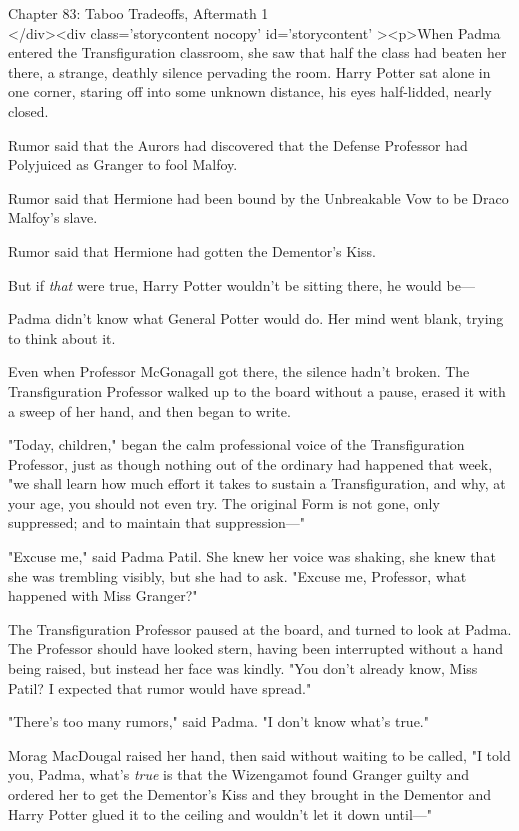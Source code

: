
Chapter 83: Taboo Tradeoffs, Aftermath 1\\
</div><div  class='storycontent nocopy' id='storycontent' ><p>When Padma 
entered the Transfiguration classroom, she saw that half the class had beaten 
her there, a strange, deathly silence pervading the room. Harry Potter sat 
alone in one corner, staring off into some unknown distance, his eyes 
half-lidded, nearly closed.

Rumor said that the Aurors had discovered that the Defense Professor had 
Polyjuiced as Granger to fool Malfoy.

Rumor said that Hermione had been bound by the Unbreakable Vow to be Draco 
Malfoy's slave.

Rumor said that Hermione had gotten the Dementor's Kiss.

But if \emph{that} were true, Harry Potter wouldn't be sitting there, he would 
be---

Padma didn't know what General Potter would do. Her mind went blank, trying to 
think about it.

Even when Professor McGonagall got there, the silence hadn't broken. The 
Transfiguration Professor walked up to the board without a pause, erased it 
with a sweep of her hand, and then began to write.

"Today, children," began the calm professional voice of the Transfiguration 
Professor, just as though nothing out of the ordinary had happened that week, 
"we shall learn how much effort it takes to sustain a Transfiguration, and why, 
at your age, you should not even try. The original Form is not gone, only 
suppressed; and to maintain that suppression---"

"Excuse me," said Padma Patil. She knew her voice was shaking, she knew that 
she was trembling visibly, but she had to ask. "Excuse me, Professor, what 
happened with Miss Granger?"

The Transfiguration Professor paused at the board, and turned to look at Padma. 
The Professor should have looked stern, having been interrupted without a hand 
being raised, but instead her face was kindly. "You don't already know, Miss 
Patil? I expected that rumor would have spread."

"There's too many rumors," said Padma. "I don't know what's true."

Morag MacDougal raised her hand, then said without waiting to be called, "I 
told you, Padma, what's \emph{true} is that the Wizengamot found Granger guilty 
and ordered her to get the Dementor's Kiss and they brought in the Dementor and 
Harry Potter glued it to the ceiling and wouldn't let it down until---"

